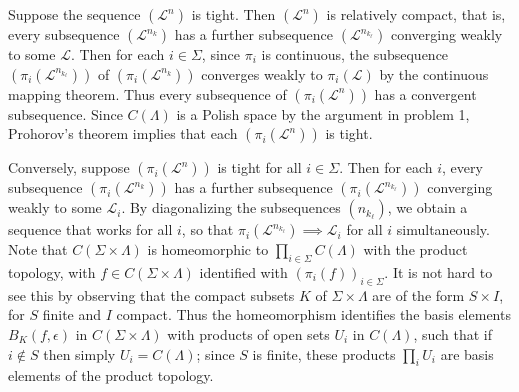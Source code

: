 \documentclass[12pt]{article}
\begin{document}
		Suppose the sequence $(\mathcal{L}^n)$ is tight. Then $(\mathcal{L}^n)$ is relatively compact, that is, every subsequence $(\mathcal{L}^{n_k})$ has a further subsequence $(\mathcal{L}^{n_{k_\ell}})$ converging weakly to some $\mathcal{L}$. Then for each $i\in\Sigma$, since $\pi_i$ is continuous, the subsequence $(\pi_i(\mathcal{L}^{n_{k_\ell}}))$ of $(\pi_i(\mathcal{L}^{n_k}))$ converges weakly to $\pi_i(\mathcal{L})$ by the continuous mapping theorem. Thus every subsequence of $(\pi_i(\mathcal{L}^n))$ has a convergent subsequence. Since $C(\Lambda)$ is a Polish space by the argument in problem 1, Prohorov's theorem implies that each $(\pi_i(\mathcal{L}^n))$ is tight.
		
		Conversely, suppose $(\pi_i(\mathcal{L}^n))$ is tight for all $i\in\Sigma$. Then for each $i$, every subsequence $(\pi_i(\mathcal{L}^{n_k}))$ has a further subsequence $(\pi_i(\mathcal{L}^{n_{k_\ell}}))$ converging weakly to some $\mathcal{L}_i$. By diagonalizing the subsequences $(n_{k_\ell})$, we obtain a sequence that works for all $i$, so that $\pi_i(\mathcal{L}^{n_{k_\ell}})\implies \mathcal{L}_i$ for all $i$ simultaneously. Note that $C(\Sigma\times\Lambda)$ is homeomorphic to $\prod_{i\in\Sigma} C(\Lambda)$ with the product topology, with $f\in C(\Sigma\times\Lambda)$ identified with $(\pi_i(f))_{i\in\Sigma}$. It is not hard to see this by observing that the compact subsets $K$ of $\Sigma\times\Lambda$ are of the form $S\times I$, for $S$ finite and $I$ compact. Thus the homeomorphism identifies the basis elements $B_K(f,\epsilon)$ in $C(\Sigma\times\Lambda)$ with products of open sets $U_i$ in $C(\Lambda)$, such that if $i\notin S$ then simply $U_i = C(\Lambda)$; since $S$ is finite, these products $\prod_i U_i$ are basis elements of the product topology.
				 
\end{document}
